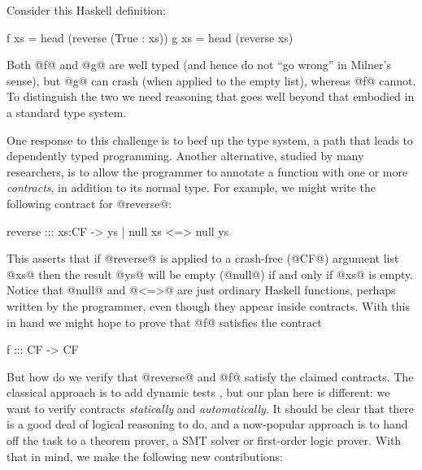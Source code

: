Consider this Haskell definition:
\begin{code}
  f xs = head (reverse (True : xs))
  g xs = head (reverse xs)
\end{code}
Both @f@ and @g@ are well typed (and hence do not ``go wrong'' in Milner's sense),
but @g@ can crash (when applied to the empty list), whereas @f@ cannot.
To distinguish the two we need reasoning that goes well beyond 
that embodied in a standard type system.

One response to this challenge is to beef up the type system, a 
path that leads to dependently typed programming.  Another alternative,
studied by many researchers, is to allow the programmer to 
annotate a function with one or more
\emph{contracts}, in addition to its normal type.
For example, we might write the following contract for @reverse@:
\begin{code}
reverse ::: xs:CF -> { ys | null xs <=> null ys }
\end{code}
This asserts that if @reverse@ is applied to a crash-free (@CF@) argument list @xs@
then the result @ys@ will be empty (@null@) if and only if @xs@ is empty.
Notice that @null@ and @<=>@ are just ordinary Haskell functions, perhaps
written by the programmer, even though they appear inside contracts.
With this in hand we might hope to prove that @f@ satisfies the contract
\begin{code}
  f ::: CF -> CF
\end{code}
But how do we verify that @reverse@ and @f@ satisfy the claimed
contracts.  The classical approach is to add dynamic tests
\cite{finder-felliesen}, but our plan here is different: we want to
verify contracts \emph{statically} and \emph{automatically}. It
should be clear that there is a good deal of logical reasoning to do,
and a now-popular approach is to hand off the task to a theorem
prover, a SMT solver or first-order logic prover.
With that in mind, we make the following new contributions:
